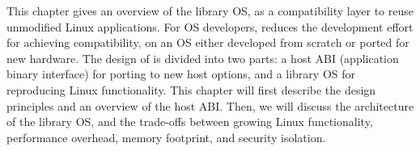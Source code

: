 This chapter gives an overview of the \graphene{} library OS, as a compatibility layer to reuse unmodified Linux applications. For OS developers, \graphene{} reduces the development effort for achieving compatibility,
on an OS either developed from scratch or ported for new hardware.
The design of \graphene{} is divided into two parts: a host ABI (application binary interface) for porting to new host options, and a library OS for reproducing Linux functionality.
This chapter will first describe the design principles and an overview of the host ABI. 
Then, we will discuss the architecture of the library OS, and the trade-offs between growing Linux functionality, performance overhead, memory footprint, and security isolation.
